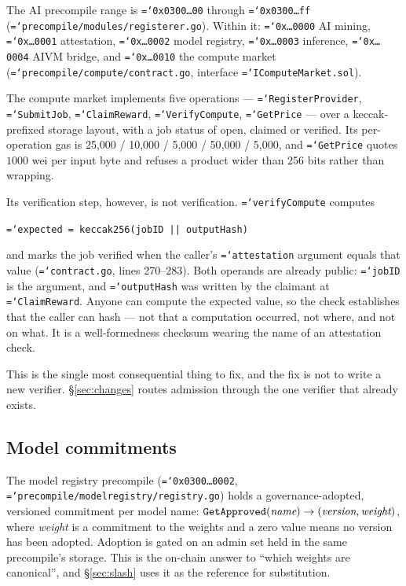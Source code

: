 \documentclass[11pt,a4paper]{article}
\newcommand{\code}[1]{\texttt{\hyphenchar\font=`\-\relax #1}}
\begin{document}
The AI precompile range is \code{0x0300\ldots00} through \code{0x0300\ldots ff}
(\code{precompile/modules/registerer.go}). Within it:
\code{0x\ldots0000} AI mining, \code{0x\ldots0001} attestation,
\code{0x\ldots0002} model registry, \code{0x\ldots0003} inference,
\code{0x\ldots0004} AIVM bridge, and \code{0x\ldots0010} the compute market
(\code{precompile/compute/contract.go}, interface
\code{IComputeMarket.sol}).

The compute market implements five operations --- \code{RegisterProvider},
\code{SubmitJob}, \code{ClaimReward}, \code{VerifyCompute}, \code{GetPrice} ---
over a keccak-prefixed storage layout, with a job status of open, claimed or
verified. Its per-operation gas is 25{,}000 / 10{,}000 / 5{,}000 / 50{,}000 /
5{,}000, and \code{GetPrice} quotes $1000$ wei per input byte and refuses a
product wider than 256 bits rather than wrapping.

Its verification step, however, is not verification. \code{verifyCompute}
computes

\begin{center}
\code{expected = keccak256(jobID || outputHash)}
\end{center}

and marks the job verified when the caller's \code{attestation} argument equals
that value (\code{contract.go}, lines 270--283). Both operands are already
public: \code{jobID} is the argument, and \code{outputHash} was written by the
claimant at \code{ClaimReward}. Anyone can compute the expected value, so the
check establishes that the caller can hash --- not that a computation occurred,
not where, and not on what. It is a well-formedness checksum wearing the name of
an attestation check.

This is the single most consequential thing to fix, and the fix is not to write
a new verifier. §\ref{sec:changes} routes admission through the one verifier
that already exists.

\subsection{Model commitments}

The model registry precompile (\code{0x0300\ldots0002},
\code{precompile/modelregistry/registry.go}) holds a governance-adopted,
versioned commitment per model name:
$\code{GetApproved}(\textit{name}) \to (\textit{version}, \textit{weight})$,
where \textit{weight} is a commitment to the weights and a zero value means no
version has been adopted. Adoption is gated on an admin set held in the same
precompile's storage. This is the on-chain answer to ``which weights are
canonical'', and §\ref{sec:slash} uses it as the reference for substitution.
\end{document}

